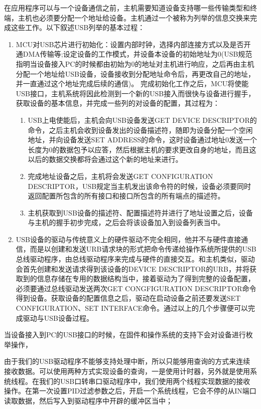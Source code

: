	
在应用程序可以与一个设备通信之前，主机需要知道设备支持哪一些传输类型和终端，主机也必须要分配一个地址给设备。主机通过一个被称为列举的信息交换来完成这些工作。以下叙述USB列举的基本过程：
\begin{enumerate}
\item {}

	MCU对USB芯片进行初始化：设置内部时钟，选择内部连接方式以及是否开通DMA传输等;设定设备的工作模式，并设备本设备的初始地址为0(USB规范指明当设备接入PC的时候都由初始为0的地址对主机进行响应，之后再由主机分配一个地址给USB设备，设备接收到分配地址命令后，再更改自己的地址，并一直通过这个地址完成后续的通信)。
	完成初始化工作之后，MCU将使能USB接口，主机系统将因此检测到一个新的USB接入而很快与设备进行握手，获取设备的基本信息，并完成一些列的对设备的配置，其过程为：
	\begin{enumerate}
	\item USB上电使能后，主机会向USB设备发送GET DEVICE DESCRIPTOR的命令，之后主机会收到设备发出的设备描述符，随即为设备分配一个空闲地址，并向设备发送SET ADDRESS的命令，这时设备通过地址0发送一个长度为0的数据包予以应答，然后根据主机的要求更改自身的地址，而且这以后的数据交换都将会通过这个新的地址来进行。
	\item 完成地址设备之后，主机将会发送GET CONFIGURATION DESCRIPTOR，USB规定当主机发出该命令符的时候，设备必须要同时返回配置所包含的所有接口和接口所包含的所有端点的描述符。
	\item 主机获取到USB设备的描述符、配置描述符并进行了地址设置之后，设备与主机的握手初步完成，之后会将该设备加入到设备列表当中。
	\end{enumerate}
	
	\item {}
	
USB设备的驱动与传统意义上的硬件驱动不完全相同，他并不与硬件直接通信，而是以创建和发送URB请求块的形式把命令传递给操作系统所提供的USB总线驱动程序，由总线驱动程序来完成与硬件的直接交互。和主机类似，驱动会首先创建和发送请求得到该设备的DEVICE DESCRIPTOR的URB，并将获取到的信息存储在专用的数据结构当中，接着驱动为了得到完整的设备配置，必须要通过总线驱动发送两次GET CONGFIGURATION DESCRIPTOR命令得到设备。获取设备的配置信息之后，驱动在启动设备之前还要发送SET CONFIGURATION、SET INTERFACE命令。通过以上的几个步骤便可以完成驱动与USB设备过程。	
\end{enumerate}

	当设备接入到PC的USB接口的时候，在固件和操作系统的支持下会对设备进行枚举操作，
	
	由于我们的USB驱动程序不能够支持处理中断，所以只能够用查询的方式来连续接收数据。可以使用两种方式实现设备的查询，一是使用计时器，另外就是使用系统线程。在我们的USB口转串口驱动程序中，我们使用两个线程实现数据的接收操作。在第一次设置PID过滤参数之后，开启一个系统线程，它会不停的从IN端口读取数据，然后写入到驱动程序中开辟的缓冲区当中；

